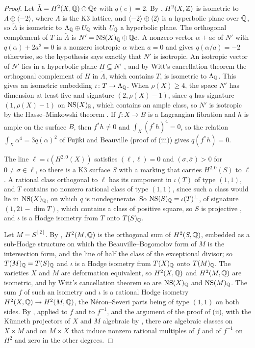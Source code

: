 \begin{proof}
Let $\tilde\Lambda=H^{2}(X,\mathbb{Q})\oplus\mathbb{Q} e$ with $q(e)=2$. By \cite{Bea83},
$H^{2}(X,\mathbb{Z})$ is isometric to $\Lambda\oplus\langle-2\rangle$, where
$\Lambda$ is the K3 lattice, and $\langle-2\rangle\oplus\langle2\rangle$
is a hyperbolic plane over $\mathbb{Q}$, so $\tilde\Lambda$ is isometric to
$\Lambda_{\mathbb{Q}}\oplus U_{\mathbb{Q}}$ with $U_{\mathbb{Q}}$ a hyperbolic plane. The
orthogonal complement of $T$ in $\tilde\Lambda$ is
$N'=\mathrm{NS}(X)_{\mathbb{Q}}\oplus\mathbb{Q} e$. A nonzero vector $\alpha+ae$ of $N'$ with
$q(\alpha)+2a^{2}=0$ is a nonzero isotropic $\alpha$ when $a=0$ and gives
$q(\alpha/a)=-2$ otherwise, so the hypothesis says exactly that $N'$ is
isotropic. An isotropic vector of $N'$ lies in a hyperbolic plane
$H\subseteq N'$ \cite{OMe00}, and by Witt's cancellation theorem the
orthogonal complement of $H$ in $\tilde\Lambda$, which contains $T$, is
isometric to $\Lambda_{\mathbb{Q}}$. This gives an isometric embedding
$\iota\colon T\to\Lambda_{\mathbb{Q}}$. When $\rho(X)\ge4$, the space $N'$ has
dimension at least five and signature $(2,\rho(X)-1)$, since $q$ has
signature $(1,\rho(X)-1)$ on $\mathrm{NS}(X)_{\mathbb{R}}$, which contains an ample class,
so $N'$ is isotropic by the Hasse--Minkowski theorem \cite[\S66]{OMe00}. If
$f\colon X\to B$ is a Lagrangian fibration and $h$ is ample on the surface
$B$, then $f^{*}h\ne0$ and $\int_{X}(f^{*}h)^{4}=0$, so the relation
$\int_{X}\alpha^{4}=3q(\alpha)^{2}$ of Fujiki and Beauville (proof of
(iii)) gives $q(f^{*}h)=0$.

The line $\ell=\iota(H^{2,0}(X))$ satisfies
$(\ell,\ell)=0$ and $(\sigma,\bar\sigma)>0$ for $0\ne\sigma\in\ell$, so there
is a K3 surface $S$ with a marking that carries $H^{2,0}(S)$ to $\ell$
\cite[Chs.~6--7]{Huy16}. A rational class orthogonal to $\ell$ has its
component in $\iota(T)$ of type $(1,1)$, and $T$ contains no nonzero rational
class of type $(1,1)$, since such a class would lie in $\mathrm{NS}(X)_{\mathbb{Q}}$, on
which $q$ is nondegenerate. So $\mathrm{NS}(S)_{\mathbb{Q}}=\iota(T)^{\perp}$, of signature
$(1,21-\dim T)$, which contains a class of positive square, so $S$ is
projective \cite[Ch.~8]{Huy16}, and $\iota$ is a Hodge isometry from $T$ onto
$T(S)_{\mathbb{Q}}$.

Let $M=S^{[2]}$. By \cite{Bea83}, $H^{2}(M,\mathbb{Q})$ is the orthogonal sum of
$H^{2}(S,\mathbb{Q})$, embedded as a sub-Hodge structure on which the
Beauville--Bogomolov form of $M$ is the intersection form, and the line of
half the class of the exceptional divisor; so $T(M)_{\mathbb{Q}}=T(S)_{\mathbb{Q}}$ and
$\iota$ is a Hodge isometry from $T(X)_{\mathbb{Q}}$ onto $T(M)_{\mathbb{Q}}$. The
varieties $X$ and $M$ are deformation equivalent, so $H^{2}(X,\mathbb{Q})$ and
$H^{2}(M,\mathbb{Q})$ are isometric, and by Witt's cancellation theorem so are
$\mathrm{NS}(X)_{\mathbb{Q}}$ and $\mathrm{NS}(M)_{\mathbb{Q}}$. The sum $f$ of such an isometry and
$\iota$ is a rational Hodge isometry $H^{2}(X,\mathbb{Q})\to H^{2}(M,\mathbb{Q})$, the
N\'eron--Severi parts being of type $(1,1)$ on both sides. By
\cite[Theorem~1.1]{Mar24}, applied to $f$ and to $f^{-1}$, and the argument
of the proof of (ii), with the K\"unneth projectors of
$X$ and $M$ algebraic by \cite[Theorem~1.1]{CM13}, there are algebraic
classes on $X\times M$ and on $M\times X$ that induce nonzero rational
multiples of $f$ and of $f^{-1}$ on $H^{2}$ and zero in the other degrees.


\end{proof}
